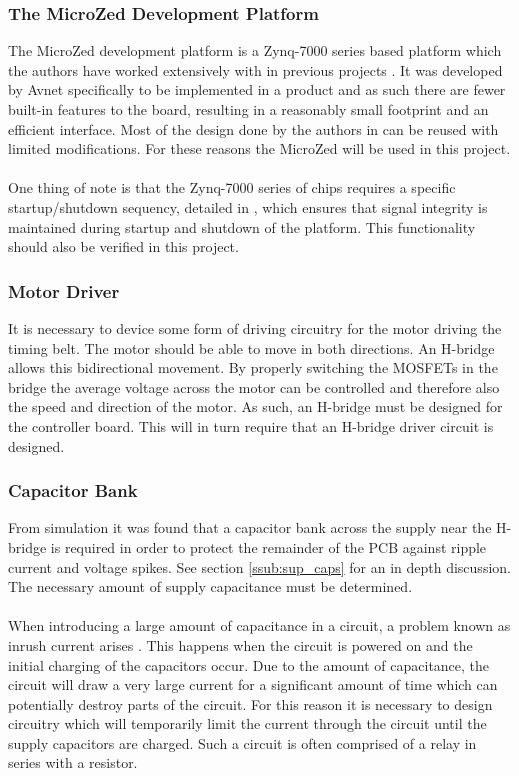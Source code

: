 \subsubsection{The MicroZed Development Platform} %
\label{ssub:microcontroller}
The MicroZed \cite{microzed} development platform is a Zynq-7000 series based platform which the authors have worked extensively with in previous projects \cite{isaswarm}.
It was developed by Avnet specifically to be implemented in a product and as such there are fewer built-in features to the board, resulting in a reasonably small footprint and an efficient interface.
Most of the design done by the authors in \cite{isaswarm} can be reused with limited modifications.
For these reasons the MicroZed will be used in this project.
\\~\\
One thing of note is that the Zynq-7000 series of chips requires a specific startup/shutdown sequency, detailed in \cite{carrier_card_design_guide}, which ensures that signal integrity is maintained during startup and shutdown of the platform.
This functionality should also be verified in this project.

\subsubsection{Motor Driver}
It is necessary to device some form of driving circuitry for the motor driving the timing belt.
The motor should be able to move in both directions. 
An H-bridge allows this bidirectional movement.
By properly switching the MOSFETs in the bridge the average voltage across the motor can be controlled and therefore also the speed and direction of the motor.
As such, an H-bridge must be designed for the controller board. 
This will in turn require that an H-bridge driver circuit is designed.

\subsubsection{Capacitor Bank} %
From simulation it was found that a capacitor bank across the supply near the H-bridge is required in order to protect the remainder of the PCB against ripple current and voltage spikes.
See section \ref{ssub:sup_caps} for an in depth discussion.
The necessary amount of supply capacitance must be determined.
\\~\\
When introducing a large amount of capacitance in a circuit, a problem known as inrush current arises \cite{inrush}.
This happens when the circuit is powered on and the initial charging of the capacitors occur.
Due to the amount of capacitance, the circuit will draw a very large current for a significant amount of time which can potentially destroy parts of the circuit.
For this reason it is necessary to design circuitry which will temporarily limit the current through the circuit until the supply capacitors are charged.
Such a circuit is often comprised of a relay in series with a resistor.

